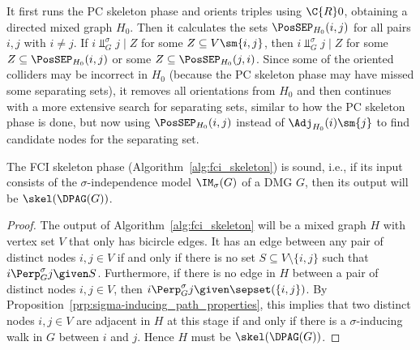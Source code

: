 It first runs the PC skeleton phase and orients triples using $\C{R}0$, obtaining a directed mixed graph $H_0$. 
Then it calculates the sets $\PosSEP_{H_0}(i,j)$ for all pairs $i,j$ with $i \ne j$.
If $i \Perp^\sigma_G j \mid Z$ for some $Z \subseteq V \sm \{i,j\}$, then
$i \Perp^\sigma_G j \mid Z$ for some $Z \subseteq \PosSEP_{H_0}(i,j)$ or some $Z \subseteq \PosSEP_{H_0}(j,i)$.
Since some of the oriented colliders may be incorrect in $H_0$ (because the PC skeleton phase may have missed some separating sets), it removes all orientations from $H_0$ and then continues with a more extensive search for separating sets, similar
to how the PC skeleton phase is done, but now using $\PosSEP_{H_0}(i,j)$ instead of $\Adj_{H_0}(i)\sm\{j\}$ to find candidate nodes for the separating set.

\begin{Thm}\label{thm:fci_skeleton_sound}
  The FCI skeleton phase (Algorithm~\ref{alg:fci_skeleton}) is sound, i.e., if its input consists of the $\sigma$-independence model $\IM_\sigma(G)$ of a DMG $G$, then its output will be $\skel(\DPAG(G))$.
\end{Thm}
\begin{proof}
  The output of Algorithm~\ref{alg:fci_skeleton} will be a mixed graph $H$ with vertex set $V$ that only has bicircle edges.
  It has an edge between any pair of distinct nodes $i,j \in V$ if and only if there is no set $S \subseteq V \setminus \{i,j\}$ such that $i \Perp^\sigma_G j \given S$.
  Furthermore, if there is no edge in $H$ between a pair of distinct nodes $i,j \in V$, then $i \Perp^\sigma_G j \given \sepset(\{i,j\})$.
  By Proposition~\ref{prp:sigma-inducing_path_properties}, this implies that two distinct nodes $i,j \in V$ are adjacent in $H$ at this stage if and only if there is a $\sigma$-inducing walk in $G$ between $i$ and $j$.
  Hence $H$ must be $\skel(\DPAG(G))$.
\end{proof}

